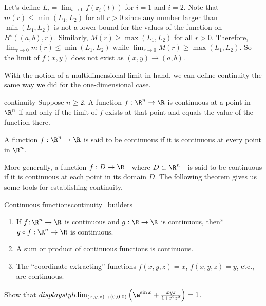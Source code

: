 \documentclass[indent]{watsonbook}
\begin{document}
{\begin{solution}[title=Proof]
  Let's define $L_i = \lim_{t \to 0}f(\mathbf{r}_i(t))$ for $i=1$ and
  $i=2$. Note that $m(r) \leq \min(L_1,L_2)$ for all $r > 0$ since any
  number larger than $\min(L_1,L_2)$ is not a lower bound for the
  values of the function on $B^\star((a,b),r)$. Similarly,
  $M(r) \geq \max(L_1,L_2)$ for all $r > 0$. Therefore,
  $\lim_{r\to 0} m(r) \leq \min(L_1, L_2)$ while
  $\lim_{r\to 0} M(r) \geq \max(L_1,L_2)$. So the limit of $f(x,y)$ does not
  exist as $(x,y) \to (a,b)$.

\end{solution}

With the notion of a multidimensional limit in hand, we can define
continuity the same way we did for the one-dimensional case.

\begin{defn}{}{continuity}
  Suppose $n \geq 2$. A function $f: \R^n \to \R$ is continuous at a
  point in $\R^n$ if and only if the limit of $f$ exists at that point
  and equals the value of the function there.

  A function $f: \R^n \to \R$ is said to be continuous if it is
  continuous at every point in $\R^n$.
\end{defn}

More generally, a function $f:D \to \R$---where $D \subset \R^n$---is
said to be continuous if it is continuous at each point in its
domain $D$. The following theorem gives us some tools for establishing
continuity.

\begin{theo}{Continuous functions}{continuity_builders}
  \begin{enumerate}[leftmargin = 12pt]
  \item If $f  \!:\! \R^n \to \R$ is continuous and $g: \R \to \R$
    is continuous, then* $g\circ f :\R^n \to \R$ is
    continuous. 
  \item A sum or product of continuous functions is continuous.
  \item The ``coordinate-extracting'' functions $f(x,y,z) = x$, $f(x,y,z) = y$, etc., are
    continuous.
  \end{enumerate}
\end{theo}

\begin{example}{}{}
  Show that ${d}isplaystyle{\lim_{(x,y,z) \to (0,0,0)}\left(\e^{\sin x} + \frac{xyz}{1 + x^2
        z^2}\right)} = 1$.
\end{example}

}
\end{document}
